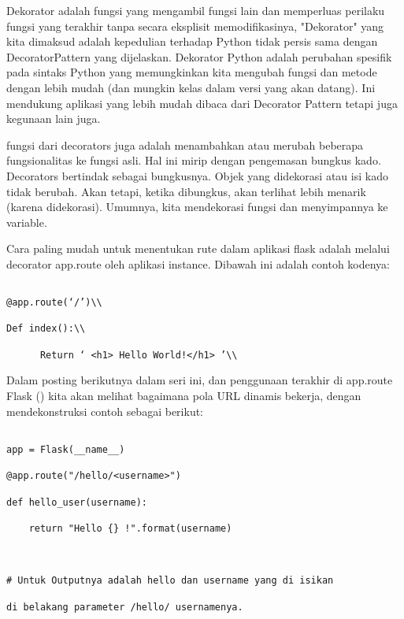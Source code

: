 \documentclass[12pt,a4paper]{article}
\begin{document}
Dekorator adalah fungsi yang mengambil fungsi lain dan memperluas perilaku fungsi yang terakhir tanpa secara eksplisit memodifikasinya, "Dekorator" yang kita dimaksud adalah kepedulian terhadap Python tidak persis sama dengan DecoratorPattern yang dijelaskan. Dekorator Python adalah perubahan spesifik pada sintaks Python yang memungkinkan kita mengubah fungsi dan metode dengan lebih mudah (dan mungkin kelas dalam versi yang akan datang). Ini mendukung aplikasi yang lebih mudah dibaca dari Decorator Pattern tetapi juga kegunaan lain juga.



fungsi dari decorators juga adalah menambahkan atau merubah beberapa fungsionalitas ke fungsi asli. Hal ini mirip dengan pengemasan bungkus kado. Decorators bertindak sebagai bungkusnya. Objek yang didekorasi atau isi kado tidak berubah. Akan tetapi, ketika dibungkus, akan terlihat lebih menarik (karena didekorasi). Umumnya, kita mendekorasi fungsi dan menyimpannya ke variable.



Cara paling mudah untuk menentukan rute dalam aplikasi flask adalah melalui decorator app.route oleh aplikasi instance. Dibawah ini adalah contoh kodenya:\\

\begin{verbatim}

@app.route(‘/’)\\

Def index():\\

      Return ‘ <h1> Hello World!</h1> ’\\

\end{verbatim}



Dalam posting berikutnya dalam seri ini, dan penggunaan terakhir di app.route Flask () kita akan melihat bagaimana pola URL dinamis bekerja, dengan mendekonstruksi contoh sebagai berikut:



\begin{verbatim}

app = Flask(__name__)

@app.route("/hello/<username>")

def hello_user(username):

    return "Hello {} !".format(username)

    

# Untuk Outputnya adalah hello dan username yang di isikan 

di belakang parameter /hello/ usernamenya.

\end{verbatim}
\end{document}
